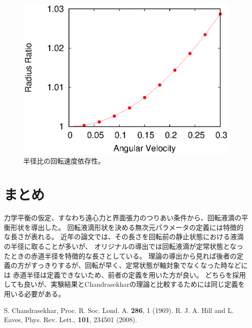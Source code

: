 \documentclass{jarticle}
\begin{document}
\begin{figure}[htbp]
\begin{center}
\includegraphics[width=0.5 \linewidth]{rotate.eps}
\end{center}
\caption{半径比の回転速度依存性。
}\label{fig::ratio}
\end{figure}

\section{まとめ}

力学平衡の仮定、すなわち遠心力と界面張力のつりあい条件から、回転液滴の平衡形状を導出した。
回転液滴形状を決める無次元パラメータの定義には特徴的な長さが表れる。
近年の論文では、その長さを回転前の静止状態における液滴の半径に取ることが多いが、
オリジナルの導出では回転液滴が定常状態となったときの赤道半径を特徴的な長さとしている。
理論の導出から見れば後者の定義の方がすっきりするが、回転が早く、定常状態が軸対象でなくなった時などには
赤道半径は定義できないため、前者の定義を用いた方が良い。
どちらを採用しても良いが、実験結果とChandrasekharの理論と比較するためには同じ定義を用いる必要がある。

\begin{thebibliography}{9}
 S. Chandrasekhar,  Proc. R. Soc. Lond. A. {\bf 286}, 1 (1969).
 R. J. A. Hill and L. Eaves, Phys. Rev. Lett., {\bf 101}, 234501 (2008). 
\end{thebibliography}
\end{document}
